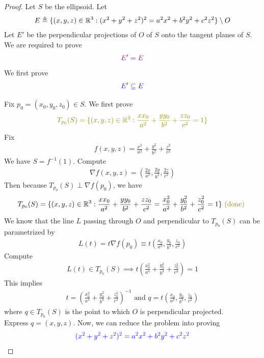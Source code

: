 \documentclass{report}
\begin{document}
\begin{proof}
Let $S$ be the ellipsoid. Let 
\begin{align*}
E\triangleq  \{ (x,y,z)\in\mathbb{R}^3 : (x^2+y^2+z^2)^2=a^2x^2+b^2y^2+c^2z^2 \}\setminus O
\end{align*}
Let $E'$ be the perpendicular projections of  $O$ of $S$ onto the tangent planes of  $S$. We are required to prove 
 \begin{align*}
   \textcolor{violet}{E'=E}
\end{align*}
We first prove 
\begin{align*}
\textcolor{blue}{E' \subseteq E}
\end{align*}


Fix $p_0=(x_0,y_0,z_0)\in S$. We first prove 
\begin{align}
\label{tp0}
\olive{T_{p_0}(S)=\set{(x,y,z)\inr^3: \frac{xx_0}{a^2}+\frac{yy_0}{b^2}+\frac{zz_0}{c^2}=1}}
\end{align}
Fix 
\begin{align*}
f(x,y,z)=\frac{x^2}{a^2}+\frac{y^2}{b^2}+\frac{z^2}{c^2}
\end{align*}
We have $S=f^{-1}(1)$. Compute 
\begin{align*}
\nabla f(x,y,z)=(\frac{2x}{a^2},\frac{2y}{b^2},\frac{2z}{c^2})
\end{align*}
Then because $T_{p_0}(S)\perp \nabla f(p_0)$, we have 
\begin{align*}
T_{p_0}(S)=\set{(x,y,z)\inr^3: \frac{x x_0}{a^2}+\frac{y y_0}{b^2}+\frac{z z_0}{c^2}=\frac{x_0^2}{a^2}+\frac{y_0^2}{b^2}+\frac{z_0^2}{c^2}=1}\odone
\end{align*}
We know that the line $L$ passing through $O$ and perpendicular to $T_{p_0}(S)$ can be parametrized by 
\begin{align*}
  L(t)=t\nabla f(p_0)\equiv t(\frac{x_0}{a^2},\frac{y_0}{b^2},\frac{z_0}{c^2})
\end{align*}
Compute 
\begin{align*}
L(t)\in T_{p_0}(S)\implies t(\frac{x_0^2}{a^4}+\frac{y_0^2}{b^4}+\frac{z_0^2}{c^4})=1
\end{align*}
This implies 
\begin{align*}
t=(\frac{x_0^2}{a^4}+\frac{y_0^2}{b^4}+\frac{z_0^2}{c^4})^{-1}\text{ and }q=t(\frac{x_0}{a^2},\frac{y_0}{b^2},\frac{z_0}{c^2})
\end{align*}
where $q\in T_{p_0}(S)$ is the point to which $O$ is perpendicular projected.\\ 

Express $q=(x,y,z)$. Now, we can reduce the problem into proving 
\begin{align*}
\textcolor{blue}{(x^2+y^2+z^2)^2=a^2x^2+b^2y^2+c^2z^2}
\end{align*}




\end{proof}
\end{document}
